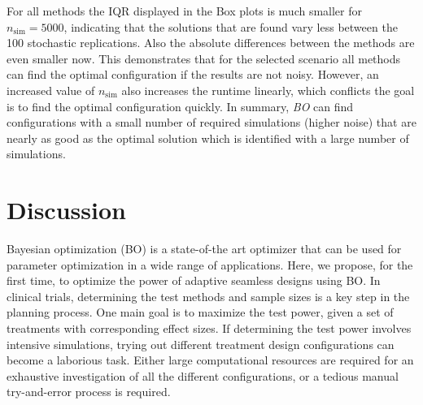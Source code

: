 \documentclass[bimj,fleqn]{w-art}
\theoremstyle{plain}
\theoremstyle{definition}
\begin{document}
For all methods the IQR displayed in the Box plots is much smaller for $n_\text{sim} = 5000$, indicating that the solutions that are found vary less between the 100 stochastic replications.
Also the absolute differences between the methods are even smaller now.
This demonstrates that for the selected scenario all methods can find the optimal configuration if the results are not noisy.
However, an increased value of $n_\text{sim}$ also increases the runtime linearly, which conflicts the goal is to find the optimal configuration quickly.
In summary, \emph{BO} can find configurations with a small number of required simulations (higher noise) that are nearly as good as the optimal solution which is identified with a large number of simulations.





\section{Discussion}
\label{sec:discussion}

Bayesian optimization (BO) is a state-of-the art optimizer that can be used for parameter optimization in a wide range of applications.
Here, we propose, for the first time, to optimize the power of adaptive seamless designs using BO.
In clinical trials, determining the test methods and sample sizes is a key step in the planning process.
One main goal is to maximize the test power, given a set of treatments with corresponding effect sizes. %
If determining the test power involves intensive simulations, trying out different treatment design configurations can become a laborious task.
Either large computational resources are required for an exhaustive investigation of all the different configurations, or a tedious manual try-and-error process is required.
\end{document}
